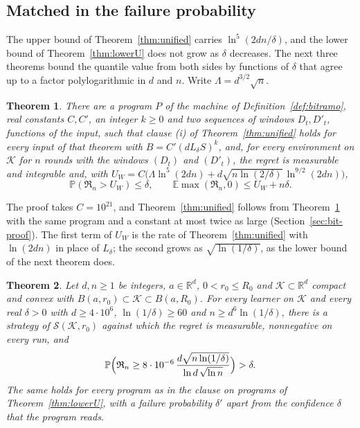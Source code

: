 \documentclass[11pt]{amsart}
\newtheorem{theorem}{Theorem}[section]
\theoremstyle{definition}
\numberwithin{equation}{section}
\newcommand{\R}{\mathbb{R}}
\newcommand{\E}{\mathbb{E}}
\newcommand{\Prob}{\mathbb{P}}
\newcommand{\cK}{\mathcal{K}}
\newcommand{\Reg}{\mathfrak{R}}
\begin{document}
\subsection{Matched in the failure probability}\label{sec:intro-matched}

The upper bound of Theorem~\ref{thm:unified} carries $\ln^5(2dn/\delta)$, and the lower bound of Theorem~\ref{thm:lowerU} does not grow as $\delta$ decreases. The next three theorems bound the quantile value from both sides by functions of $\delta$ that agree up to a factor polylogarithmic in $d$ and $n$. Write $\Lambda=d^{3/2}\sqrt n$.

\begin{theorem}\label{thm:uw}
There are a program $P$ of the machine of Definition~\ref{def:bitramo}, real constants $C,C'$, an integer $k\ge0$ and two sequences of windows $D_t,D'_t$, functions of the input, such that clause (i) of Theorem~\ref{thm:unified} holds for every input of that theorem with $B=C'(dL_\delta S)^k$, and, for every environment on $\cK$ for $n$ rounds with the windows $(D_t)$ and $(D'_t)$, the regret is measurable and integrable and, with $U_W=C\bigl(\Lambda\ln^5(2dn)+d\sqrt{n\ln(2/\delta)}\,\ln^{9/2}(2dn)\bigr)$,
\[
\Prob(\Reg_n>U_W)\le\delta,\qquad\E\max(\Reg_n,0)\le U_W+n\delta.
\]
\end{theorem}

The proof takes $C=10^{21}$, and Theorem~\ref{thm:unified} follows from Theorem~\ref{thm:uw} with the same program and a constant at most twice as large (Section~\ref{sec:bit-proof}). The first term of $U_W$ is the rate of Theorem~\ref{thm:unified} with $\ln(2dn)$ in place of $L_\delta$; the second grows as $\sqrt{\ln(1/\delta)}$, as the lower bound of the next theorem does.

\begin{theorem}\label{thm:grow}
Let $d,n\ge1$ be integers, $a\in\R^d$, $0<r_0\le R_0$ and $\cK\subset\R^d$ compact and convex with $B(a,r_0)\subset\cK\subset B(a,R_0)$. For every learner on $\cK$ and every real $\delta>0$ with $d\ge4\cdot10^6$, $\ln(1/\delta)\ge60$ and $n\ge d^6\ln(1/\delta)$, there is a strategy of $\mathcal S(\cK,r_0)$ against which the regret is measurable, nonnegative on every run, and
\[
\Prob\Bigl(\Reg_n\ge8\cdot10^{-6}\,\frac{d\sqrt{n\ln(1/\delta)}}{\ln d\,\sqrt{\ln n}}\Bigr)>\delta.
\]
The same holds for every program as in the clause on programs of Theorem~\ref{thm:lowerU}, with a failure probability $\delta'$ apart from the confidence $\delta$ that the program reads.
\end{theorem}
\end{document}
